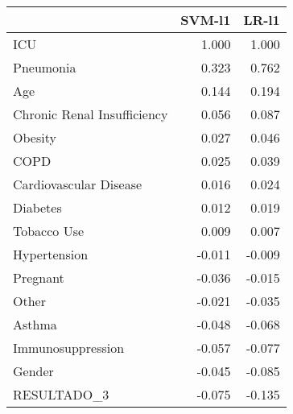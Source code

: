 \begin{tabular}{lrr}
\toprule
{} &  SVM-l1 &  LR-l1 \\
\midrule
ICU                         &   1.000 &  1.000 \\
Pneumonia                   &   0.323 &  0.762 \\
Age                         &   0.144 &  0.194 \\
Chronic Renal Insufficiency &   0.056 &  0.087 \\
Obesity                     &   0.027 &  0.046 \\
COPD                        &   0.025 &  0.039 \\
Cardiovascular Disease      &   0.016 &  0.024 \\
Diabetes                    &   0.012 &  0.019 \\
Tobacco Use                 &   0.009 &  0.007 \\
Hypertension                &  -0.011 & -0.009 \\
Pregnant                    &  -0.036 & -0.015 \\
Other                       &  -0.021 & -0.035 \\
Asthma                      &  -0.048 & -0.068 \\
Immunosuppression           &  -0.057 & -0.077 \\
Gender                      &  -0.045 & -0.085 \\
RESULTADO\_3                 &  -0.075 & -0.135 \\
\bottomrule
\end{tabular}

